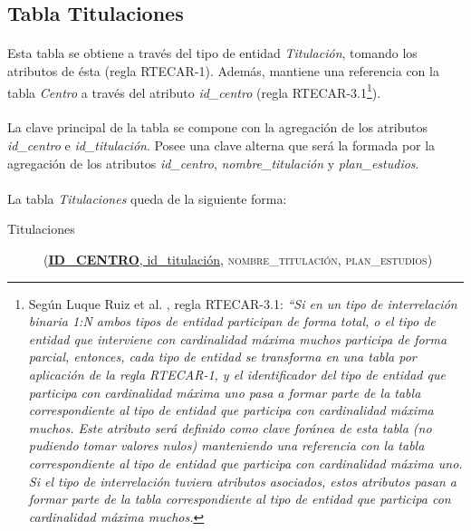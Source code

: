    \subsection{Tabla Titulaciones}

      \paragraph{}Esta tabla se obtiene a través del tipo de entidad
      \textit{Titulación}, tomando los atributos de ésta (regla RTECAR-1).
      Además, mantiene una referencia con la tabla \textit{Centro} a través
      del atributo \textit{id\_centro} (regla RTECAR-3.1\footnote{Según Luque
      Ruiz et al. \cite{luqueRuiz}, regla RTECAR-3.1: \textit{``Si en un tipo de
      interrelación binaria 1:N ambos tipos de entidad participan de forma
      total, o el tipo de entidad que interviene con cardinalidad máxima muchos
      participa de forma parcial, entonces, cada tipo de entidad se transforma
      en una tabla por aplicación de la regla RTECAR-1, y el identificador del
      tipo de entidad que participa con cardinalidad máxima uno pasa a formar
      parte de la tabla correspondiente al tipo de entidad que participa con
      cardinalidad máxima muchos. Este atributo será definido como clave foránea
      de esta tabla (no pudiendo tomar valores nulos) manteniendo una referencia
      con la tabla correspondiente al tipo de entidad que participa con
      cardinalidad máxima uno. Si el tipo de interrelación tuviera atributos
      asociados, estos atributos pasan a formar parte de la tabla
      correspondiente al tipo de entidad que participa con cardinalidad máxima
      muchos.}}).

      \paragraph{}La clave principal de la tabla se compone con la agregación de
      los atributos \textit{id\_centro} e \textit{id\_titulación}. Posee una
      clave alterna que será la formada por la agregación de los atributos
      \textit{id\_centro}, \textit{nombre\_titulación} y
      \textit{plan\_estudios}.

      \paragraph{}La tabla \textit{Titulaciones} queda de la siguiente forma:

      \begin{description}
         \item[Titulaciones] \begin{flushleft}(\underline{\textbf{ID\_CENTRO},
         id\_titulación}, \textsc{nombre\_titulación},
         \textsc{plan\_estudios})\end{flushleft}
      \end{description}
